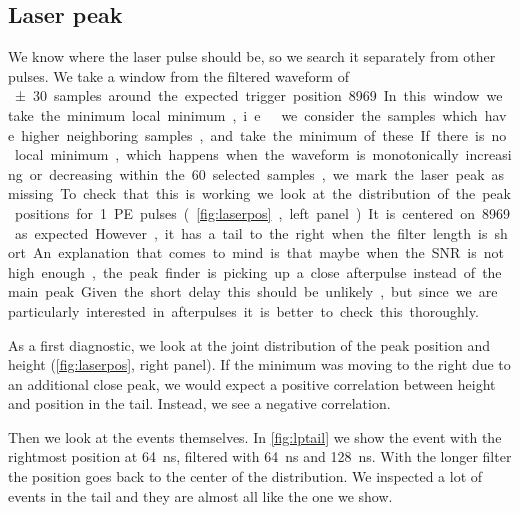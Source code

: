 \subsection{Laser peak}
\label{sec:laser}

We know where the laser pulse should be, so we search it separately from other
pulses. We take a window from the filtered waveform of \SI{\pm 30} samples
around the expected trigger position 8969. In this window we take the minimum
local minimum, i.e.\ we consider the samples which have higher neighboring
samples, and take the minimum of these. If there is no local minimum, which
happens when the waveform is monotonically increasing or decreasing within the
60 selected samples, we mark the laser peak as missing.

To check that this is working we look at the distribution of the peak positions
for 1 PE pulses (\autoref{fig:laserpos}, left panel). It is centered on 8969 as
expected. However, it has a tail to the right when the filter length is short.
An explanation that comes to mind is that maybe when the SNR is not high
enough, the peak finder is picking up a close afterpulse instead of the main
peak. Given the short delay this should be unlikely, but since we are
particularly interested in afterpulses it is better to check this thoroughly.

\begin{figure}


    
\end{figure}

As a first diagnostic, we look at the joint distribution of the peak position
and height (\autoref{fig:laserpos}, right panel). If the minimum was moving to
the right due to an additional close peak, we would expect a positive
correlation between height and position in the tail. Instead, we see a negative
correlation.

Then we look at the events themselves. In \autoref{fig:lptail} we show the
event with the rightmost position at \SI{64}{ns}, filtered with \SI{64}{ns} and
\SI{128}{ns}. With the longer filter the position goes back to the center of
the distribution. We inspected a lot of events in the tail and they are almost
all like the one we show.

